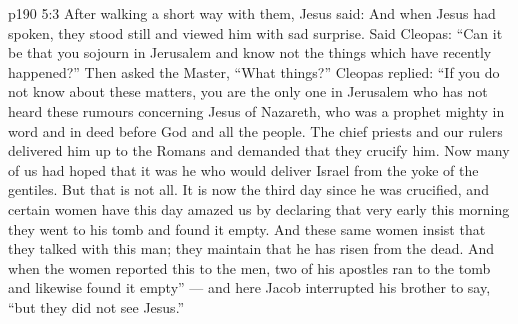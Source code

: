 \vs p190 5:3 After walking a short way with them, Jesus said:  And when Jesus had spoken, they stood still and viewed him with sad surprise. Said Cleopas: “Can it be that you sojourn in Jerusalem and know not the things which have recently happened?” Then asked the Master, “What things?” Cleopas replied: “If you do not know about these matters, you are the only one in Jerusalem who has not heard these rumours concerning Jesus of Nazareth, who was a prophet mighty in word and in deed before God and all the people. The chief priests and our rulers delivered him up to the Romans and demanded that they crucify him. Now many of us had hoped that it was he who would deliver Israel from the yoke of the gentiles. But that is not all. It is now the third day since he was crucified, and certain women have this day amazed us by declaring that very early this morning they went to his tomb and found it empty. And these same women insist that they talked with this man; they maintain that he has risen from the dead. And when the women reported this to the men, two of his apostles ran to the tomb and likewise found it empty” --- and here Jacob interrupted his brother to say, “but they did not see Jesus.”
